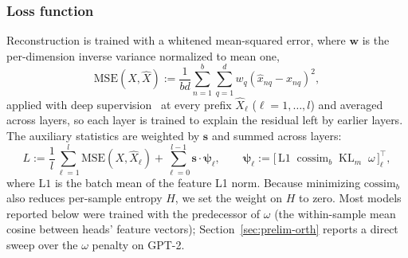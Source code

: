 \subsubsection{Loss function}
\label{sec:loss}
Reconstruction is trained with a whitened mean-squared error, where
$\mathbf{w}$ is the per-dimension inverse variance normalized to mean one,
\begin{equation}
	\mathrm{MSE}(X,\hat{X}) := \frac{1}{bd}\sum^{b}_{n=1}\sum^{d}_{q=1}
	w_q\left(\hat{x}_{nq} - x_{nq}\right)^2,
	\label{eq:mse}
\end{equation}
applied with deep supervision~\cite{lee2015deeply} at every prefix
$\hat{X}_\ell$ ($\ell = 1, \dots, l$) and averaged across layers, so each
layer is trained to explain the residual left by earlier layers. The
auxiliary statistics are weighted by $\mathbf{s}$ and summed across
layers:
\begin{equation}
	L := \frac{1}{l}\sum^{l}_{\ell=1}\mathrm{MSE}(X,\hat{X}_\ell)
	+ \sum^{l-1}_{\ell=0}\mathbf{s}\cdot\boldsymbol{\psi}_\ell,
	\qquad
	\boldsymbol{\psi}_\ell := \big[\, \mathrm{L1} \;\; \mathrm{cossim}_b \;\;
	\mathrm{KL}_m \;\; \omega \,\big]^{\top}_\ell,
	\label{eq:loss_total}
\end{equation}
where $\mathrm{L1}$ is the batch mean of the feature L1 norm. Because
minimizing $\mathrm{cossim}_b$ also reduces per-sample entropy $H$, we
set the weight on $H$ to zero. Most models reported below were trained
with the predecessor of $\omega$ (the within-sample mean cosine between
heads' feature vectors); Section~\ref{sec:prelim-orth} reports a direct
sweep over the $\omega$ penalty on GPT-2.

